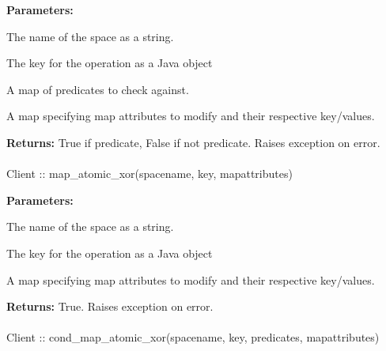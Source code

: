 \noindent\textbf{Parameters:}
\begin{description}[labelindent=\widthof{{\code{mapattributes}}},leftmargin=*,noitemsep,nolistsep,align=right]
\item[\code{spacename}] The name of the space as a string.
\item[\code{key}] The key for the operation as a Java object
\item[\code{predicates}] A map of predicates to check against.
\item[\code{mapattributes}] A map specifying map attributes to modify and their respective key/values.
\end{description}

\noindent\textbf{Returns:}
True if predicate, False if not predicate.  Raises exception on error.

\paragraph{}
\label{api:java:map_atomic_xor}
\begin{javacode}
Client :: map_atomic_xor(spacename, key, mapattributes)
\end{javacode}
\funcdesc 

\noindent\textbf{Parameters:}
\begin{description}[labelindent=\widthof{{\code{mapattributes}}},leftmargin=*,noitemsep,nolistsep,align=right]
\item[\code{spacename}] The name of the space as a string.
\item[\code{key}] The key for the operation as a Java object
\item[\code{mapattributes}] A map specifying map attributes to modify and their respective key/values.
\end{description}

\noindent\textbf{Returns:}
True.  Raises exception on error.

\paragraph{}
\label{api:java:cond_map_atomic_xor}
\begin{javacode}
Client :: cond_map_atomic_xor(spacename, key, predicates, mapattributes)
\end{javacode}
\funcdesc 

